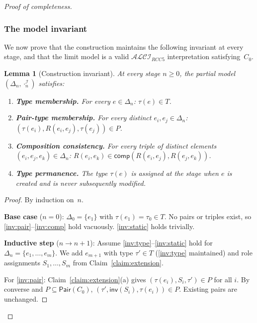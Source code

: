 \documentclass[a4paper,11pt]{article}
\newtheorem{lemma}[theorem]{Lemma}
\theoremstyle{definition}
\newcommand{\ALCIRCC}[1]{\ensuremath{\mathcal{ALCI}_{\mathit{RCC#1}}}}
\newcommand{\interp}{\ensuremath{\mathcal{I}}}
\newcommand{\inv}{\ensuremath{\mathsf{inv}}}
\newcommand{\comp}{\ensuremath{\mathsf{comp}}}
\newcommand{\Pair}{\ensuremath{\mathsf{Pair}}}
\begin{document}
\begin{proof}[Proof of completeness]
\subsubsection*{The model invariant}

We now prove that the construction maintains the following invariant at
every stage, and that the limit model is a valid $\ALCIRCC{5}$
interpretation satisfying~$C_0$.

\begin{lemma}[Construction invariant]
\label{lem:invariant}
At every stage $n \geq 0$, the partial model $(\Delta_n,
\cdot^{\interp}_n)$ satisfies:
\begin{enumerate}[label=\textup{(I\arabic*)},nosep]
  \item \label{inv:type} \textbf{Type membership.}\; For every $e \in
    \Delta_n$: $\tau(e) \in T$.
  \item \label{inv:pair} \textbf{Pair-type membership.}\; For every
    distinct $e_i, e_j \in \Delta_n$: $(\tau(e_i), R(e_i, e_j),
    \tau(e_j)) \in P$.
  \item \label{inv:comp} \textbf{Composition consistency.}\; For every
    triple of distinct elements $(e_i, e_j, e_k) \in \Delta_n$:
    $R(e_i, e_k) \in \comp(R(e_i, e_j), R(e_j, e_k))$.
  \item \label{inv:static} \textbf{Type permanence.}\; The type
    $\tau(e)$ is assigned at the stage when $e$ is created and is
    never subsequently modified.
\end{enumerate}
\end{lemma}

\begin{proof}
By induction on~$n$.

\smallskip\noindent\textbf{Base case} ($n = 0$): $\Delta_0 =
\{e_1\}$ with $\tau(e_1) = \tau_0 \in T$.  No pairs or triples
exist, so \ref{inv:pair}--\ref{inv:comp} hold vacuously.
\ref{inv:static} holds trivially.

\smallskip\noindent\textbf{Inductive step} ($n \to n+1$): Assume
\ref{inv:type}--\ref{inv:static} hold for $\Delta_n = \{e_1, \ldots,
e_m\}$.  We add $e_{m+1}$ with type $\tau' \in T$
(\ref{inv:type} maintained) and role assignments $S_1, \ldots, S_m$
from Claim~\ref{claim:extension}.

For \ref{inv:pair}: Claim~\ref{claim:extension}(a) gives
$(\tau(e_i), S_i, \tau') \in P$ for all $i$.  By converse and $P
\subseteq \Pair(C_0)$, $(\tau', \inv(S_i), \tau(e_i)) \in P$.
Existing pairs are unchanged.


\end{proof}
\end{proof}
\end{document}
